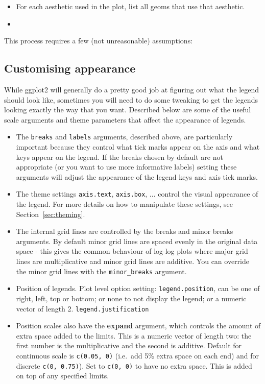 \begin{itemize}
  \item For each aesthetic used in the plot, list all geoms that use that aesthetic. 
  \item 
\end{itemize}

This process requires a few (not unreasonable) assumptions:

\subsection{Customising appearance}

While ggplot2 will generally do a pretty good job at figuring out what the legend should look like, sometimes you will need to do some tweaking to get the legends looking exactly the way that you want.  Described below are some of the useful scale arguments and theme parameters that affect the appearance of legends.  

\begin{itemize}
  \item The {\tt breaks} and {\tt labels} arguments, described above, are particularly important because they control what tick marks appear on the axis and what keys appear on the legend.  If the breaks chosen by default are not appropriate (or you want to use more informative labels) setting these arguments will adjust the appearance of the legend keys and axis tick marks.  
  
  \item The theme settings {\tt axis.text}, {\tt axis.box}, ... control the visual appearance of the legend.  For more details on how to manipulate these settings, see Section~\ref{sec:theming}.

  \item The internal grid lines are controlled by the breaks and minor breaks arguments.  By default minor grid lines are spaced evenly in the original data space - this gives the common behaviour of log-log plots where major grid lines are multiplicative and minor grid lines are additive.  You can override the minor grid lines with the {\tt minor\_breaks} argument.
  
  \item Position of legends.  Plot level option setting: {\tt legend.position}, can be one of right, left, top or bottom; or none to not display the legend; or a numeric vector of length 2.  {\tt legend.justification}
  
  \item Position scales also have the {\bf expand} argument, which controls the amount of extra space added to the limits.  This is a numeric vector of length two: the first number is the multiplicative and the second is additive.  Default for continuous scale is {\tt c(0.05, 0)} (i.e.\ add 5\% extra space on each end) and for discrete {\tt c(0, 0.75)}).  Set to {\tt c(0, 0)} to have no extra space.  This is added on top of any specified limits.
  
\end{itemize}

